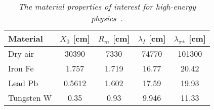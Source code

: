         \begin{table}[H]
        \begin{center}
        \begin{tabular}{l c c c c}
        \hline
	Material & $X_0$ [cm] & $R_m$ [cm] &  $\lambda_{I}$ [cm] & $\lambda_{\pi^{\pm}}$ [cm]  \\
	\hline
	Dry air  & 30390 & 7330 & 74770 & 101300 \\
	Iron Fe  & 1.757 & 1.719 & 16.77 & 20.42 \\
	Lead  Pb & 0.5612 & 1.602 & 17.59 & 19.93 \\
	Tungsten W &0.35&0.93& 9.946 & 11.33 \\ 
        \hline
        \end{tabular}
        \end{center}
        \caption{\sl The material properties of interest for high-energy physics~\cite{bib:PDGprop}. }
        \label{table:material}
        \end{table}
